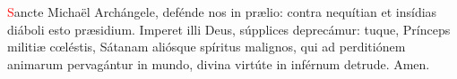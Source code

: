 \textcolor{red}{S}ancte Michaël Archángele, defénde nos in pr{\ae}lio: contra nequítian et insídias diáboli esto pr{\ae}sidium. Imperet illi Deus, 
súpplices deprecámur: tuque, Prínceps militi{\ae} c{\oe}léstis, Sátanam aliósque spíritus malignos, qui ad perditiónem animarum pervagántur in mundo,
divina virtúte in inférnum detrude. Amen.